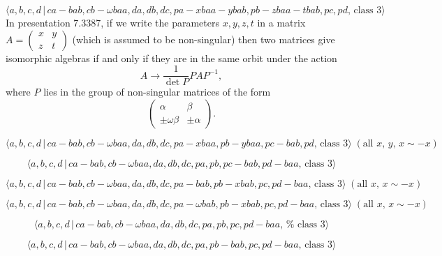 \documentclass[10pt]{article}
\begin{document}
\begin{equation}
\langle a,b,c,d\,|\,ca-bab,cb-\omega
baa,da,db,dc,pa-xbaa-ybab,pb-zbaa-tbab,pc,pd,\,\text{class }3\rangle 
\tag{7.3387}
\end{equation}%
In presentation 7.3387, if we write the parameters $x,y,z,t$ in a matrix $%
A=\left( 
\begin{array}{cc}
x & y \\ 
z & t%
\end{array}%
\right) $ (which is assumed to be non-singular) then two matrices give
isomorphic algebras if and only if they are in the same orbit under the
action%
\[
A\rightarrow \frac{1}{\det P}PAP^{-1}, 
\]%
where $P$ lies in the group of non-singular matrices of the form%
\[
\left( 
\begin{array}{ll}
\alpha & \beta \\ 
\pm \omega \beta & \pm \alpha%
\end{array}%
\right) . 
\]

\begin{equation}
\langle a,b,c,d\,|\,ca-bab,cb-\omega
baa,da,db,dc,pa-xbaa,pb-ybaa,pc-bab,pd,\,\text{class }3\rangle \;(\text{all }%
x,\,y,\,x\sim -x)  \tag{7.3388}
\end{equation}

\begin{equation}
\langle a,b,c,d\,|\,ca-bab,cb-\omega baa,da,db,dc,pa,pb,pc-bab,pd-baa,\,%
\text{class }3\rangle  \tag{7.3389}
\end{equation}

\begin{equation}
\langle a,b,c,d\,|\,ca-bab,cb-\omega baa,da,db,dc,pa-bab,pb-xbab,pc,pd-baa,\,%
\text{class }3\rangle \;(\text{all }x,\,x\sim -x)  \tag{7.3390}
\end{equation}

\begin{equation}
\langle a,b,c,d\,|\,ca-bab,cb-\omega baa,da,db,dc,pa-\omega
bab,pb-xbab,pc,pd-baa,\,\text{class }3\rangle \;(\text{all }x,\,x\sim -x) 
\tag{7.3391}
\end{equation}

\begin{equation}
\langle a,b,c,d\,|\,ca-bab,cb-\omega baa,da,db,dc,pa,pb,pc,pd-baa,\,\text{%
class }3\rangle  \tag{7.3392}
\end{equation}

\begin{equation}
\langle a,b,c,d\,|\,ca-bab,cb-\omega baa,da,db,dc,pa,pb-bab,pc,pd-baa,\,%
\text{class }3\rangle  \tag{7.3393}
\end{equation}
\end{document}
